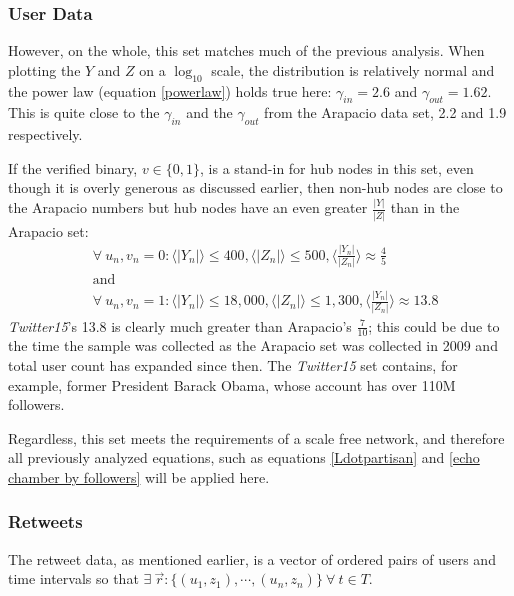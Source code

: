 \documentclass[preprint,review,12pt]{elsarticle}
\begin{document}
 \subsubsection{User Data}
However, on the whole, this set matches much of the previous analysis. When plotting the $Y$ and $Z$ on a $\log_{10}$ scale, the distribution is relatively normal and the power law (equation \ref{powerlaw}) holds true here:  $\gamma_{in} = 2.6$ and $\gamma_{out} = 1.62$. This is quite close to the $\gamma_{in}$ and the $\gamma_{out}$  from the Arapacio data set, 2.2 and 1.9 respectively.

If the verified binary, $v \in \{0,1\}$, is a stand-in for hub nodes in this set, even though it is overly generous as discussed earlier, then non-hub nodes are close to the Arapacio numbers but hub nodes have an even greater $\frac{|Y|}{|Z|}$ than in the Arapacio set:
\[
\begin{split}
& \forall \ u_n, v_n  = 0:\langle |Y_n| \rangle \leq 400, \langle |Z_n| \rangle \leq 500, \langle  \frac{|Y_n|}{|Z_n|} \rangle \approx \frac{4}{5} \\ &\text{and} \\ & \forall \ u_n, v_n  = 1:\langle |Y_n| \rangle \leq 18,000, \langle |Z_n| \rangle \leq 1,300, \langle  \frac{|Y_n|}{|Z_n|} \rangle \approx 13.8
\end{split}
\]
\textit{Twitter15}'s 13.8 is clearly much greater than Arapacio's $\frac{7}{10}$; this could be due to the time the sample was collected as the Arapacio set was collected in 2009 and total user count has expanded since then. The \textit{Twitter15} set contains, for example, former President Barack Obama, whose account has over 110M followers. 

Regardless, this set meets the requirements of a scale free network, and therefore all previously analyzed equations, such as equations \ref{Ldotpartisan} and \ref{echo chamber by followers} will be applied here.

\subsubsection{Retweets}
The retweet data, as mentioned earlier, is a vector of ordered pairs of users and time intervals so that $ \exists \ \vec{r}:\{(u_1,z_1), \cdots, (u_n,z_n)\} \ \forall \ t \in T$.
\end{document}
